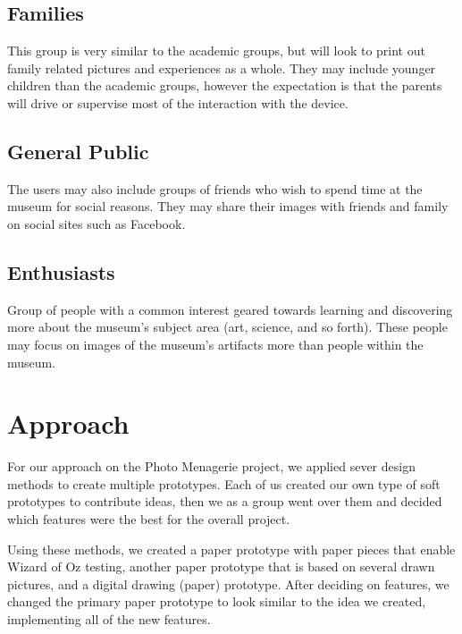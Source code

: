 \documentclass{tei2013}
\begin{document}
\subsection{Families}
This group is very similar to the academic groups, but will look to print out family related pictures and experiences as a whole.  They may include younger children than the academic groups, however the expectation is that the parents will drive or supervise most of the interaction with the device.  
\subsection{General Public}
The users may also include groups of friends who wish to spend time at the museum for social reasons.  They may share their images with friends and family on social sites such as Facebook.
\subsection{Enthusiasts}
Group of people with a common interest geared towards learning and discovering more about the museum's subject area (art, science, and so forth).  These people may focus on images of the museum's artifacts more than people within the museum.


\section{Approach}
For our approach on the Photo Menagerie project, we applied sever design methods to create multiple prototypes. Each of us created our own type of soft prototypes to contribute ideas, then we as a group went over them and decided which features were the best for the overall project. 

Using these methods, we created a paper prototype with paper pieces that enable Wizard of Oz testing, another paper prototype that is based on several drawn pictures, and a digital drawing (paper) prototype. After deciding on features, we changed the primary paper prototype to look similar to the idea we created, implementing all of the new features. 
\end{document}
